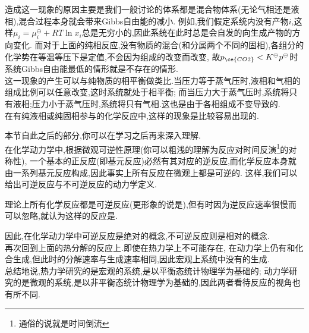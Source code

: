 \documentclass{ctexart}
\begin{document}
\begin{hint}
    造成这一现象的原因主要是我们一般讨论的体系都是混合物体系(无论气相还是液相),混合过程本身就会带来Gibbs自由能的减小.%
    例如,我们假定系统内没有产物$i$,这样$\mu_i=\mu_i^\ominus+RT\ln x_i$总是无穷小的,因此系统在此时总是会自发的向生成产物的方向变化.%
    而对于上面的纯相反应,没有物质的混合(和分属两个不同的固相),各组分的化学势在等温等压下是定值,不会因为组成的改变而改变,%
    故$p_{\ce{CO2}}<K^\ominus p^\ominus$时系统Gibbs自由能最低的情形就是不存在的情形\footnotemark.\\
    这一现象的产生可以与纯物质的相平衡做类比.当压力等于蒸气压时,液相和气相的组成比例可以任意改变,这时系统就处于相平衡;%
    而当压力大于蒸气压时,系统将只有液相;压力小于蒸气压时,系统将只有气相.这也是由于各相组成不变导致的.\\
    在有纯液相或纯固相参与的化学反应中,这样的现象是比较容易出现的.
\end{hint}
本节自此之后的部分,你可以在学习之后再来深入理解.\\
\indent 在化学动力学中,根据微观可逆性原理(你可以粗浅的理解为反应对时间反演\footnote{通俗的说就是时间倒流}的对称性),%
一个基本的正反应(即基元反应)必然有其对应的逆反应,而化学反应本身就由一系列基元反应构成,因此事实上所有反应在微观上都是可逆的.%
这样,我们可以给出可逆反应与不可逆反应的动力学定义.
\begin{definition}[5B.3.5 动力学中的可逆反应与不可逆反应]
    理论上所有化学反应都是可逆反应(更形象的说是),但有时因为逆反应速率很慢而可以忽略,就认为这样的反应是.
\end{definition}
因此,在化学动力学中可逆反应是绝对的概念,不可逆反应则是相对的概念.\\
\indent 再次回到上面的热分解的反应上.即使在热力学上不可能存在,%
在动力学上仍有和化合生成,但此时的分解速率与生成速率相同,因此宏观上系统中没有的生成.\\
\indent 总结地说,热力学研究的是宏观的系统,是以平衡态统计物理学为基础的;%
动力学研究的是微观的系统,是以非平衡态统计物理学为基础的,因此两者看待反应的视角也有所不同.
\end{document}

